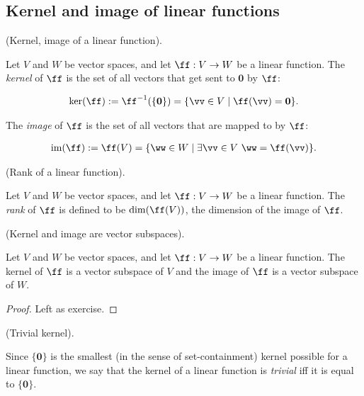 \newpage

\subsection*{Kernel and image of linear functions}

\begin{defn}
    (Kernel, image of a linear function).
    
    Let $V$ and $W$ be vector spaces, and let $\ff:V \rightarrow W$ be a linear function. The \textit{kernel} of $\ff$ is the set of all vectors that get sent to $\mathbf{0}$ by $\ff$:
    
    \begin{align*}
        \ker(\ff) := \ff^{-1}(\{\mathbf{0}\}) = \{ \vv \in V \mid \ff(\vv) = \mathbf{0} \}.
    \end{align*}
    
    The \textit{image} of $\ff$ is the set of all vectors that are mapped to by $\ff$:
    
    \begin{align*}
        \im(\ff) := \ff(V) = \{ \ww \in W \mid \exists \vv \in V \spc \ww = \ff(\vv) \}.
    \end{align*}
\end{defn}

\begin{defn}
\label{ch::lin_alg::defn::rank}
    (Rank of a linear function). 
    
    Let $V$ and $W$ be vector spaces, and let $\ff:V \rightarrow W$ be a linear function. The \textit{rank} of $\ff$ is defined to be $\dim(\ff(V))$, the dimension of the image of $\ff$.
\end{defn}

\begin{theorem}
    (Kernel and image are vector subspaces). 
    
    Let $V$ and $W$ be vector spaces, and let $\ff:V \rightarrow W$ be a linear function. The kernel of $\ff$ is a vector subspace of $V$ and the image of $\ff$ is a vector subspace of $W$.
\end{theorem}

\begin{proof}
   Left as exercise.
\end{proof}

\begin{defn}
    (Trivial kernel).
    
    Since $\{\mathbf{0}\}$ is the smallest (in the sense of set-containment) kernel possible for a linear function, we say that the kernel of a linear function is \textit{trivial} iff it is equal to $\{\mathbf{0}\}$.
\end{defn}

